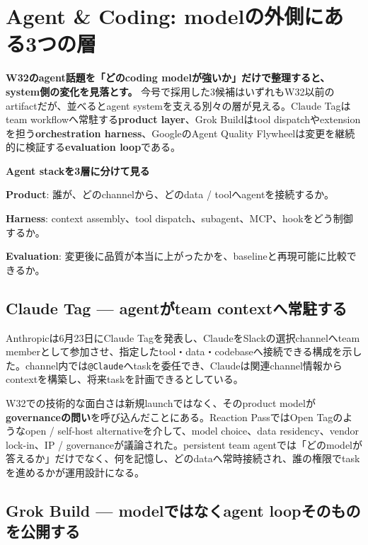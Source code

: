 \section{Agent \& Coding: modelの外側にある3つの層}

\textbf{W32のagent話題を「どのcoding modelが強いか」だけで整理すると、system側の変化を見落とす。}
今号で採用した3候補はいずれもW32以前のartifactだが、並べるとagent systemを支える別々の層が見える。Claude Tagはteam workflowへ常駐する\textbf{product layer}、Grok Buildはtool dispatchやextensionを担う\textbf{orchestration harness}、GoogleのAgent Quality Flywheelは変更を継続的に検証する\textbf{evaluation loop}である。

\begin{tcolorbox}[enhanced,breakable,colback=SurveySoft,colframe=SurveyRule,boxrule=0.4pt,arc=1mm,left=2mm,right=2mm,top=1.5mm,bottom=1.5mm]
\textbf{Agent stackを3層に分けて見る}\par\smallskip
\textbf{Product}: 誰が、どのchannelから、どのdata / toolへagentを接続するか。\par
\textbf{Harness}: context assembly、tool dispatch、subagent、MCP、hookをどう制御するか。\par
\textbf{Evaluation}: 変更後に品質が本当に上がったかを、baselineと再現可能に比較できるか。
\end{tcolorbox}

\subsection*{Claude Tag --- agentがteam contextへ常駐する}

Anthropicは6月23日にClaude Tagを発表し、ClaudeをSlackの選択channelへteam memberとして参加させ、指定したtool・data・codebaseへ接続できる構成を示した。channel内では\texttt{@Claude}へtaskを委任でき、Claudeは関連channel情報からcontextを構築し、将来taskを計画できるとしている\cite{claude-tag-announcement}。

W32での技術的な面白さは新規launchではなく、そのproduct modelが\textbf{governanceの問い}を呼び込んだことにある。Reaction PassではOpen Tagのようなopen / self-host alternativeを介して、model choice、data residency、vendor lock-in、IP / governanceが議論された\cite{claude-tag-x-opentag,claude-tag-x-governance}。persistent team agentでは「どのmodelが答えるか」だけでなく、何を記憶し、どのdataへ常時接続され、誰の権限でtaskを進めるかが運用設計になる。

\subsection*{Grok Build --- modelではなくagent loopそのものを公開する}

